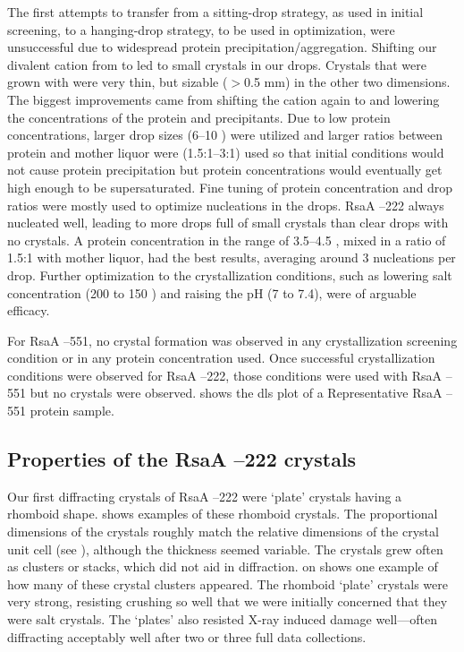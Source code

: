 The first attempts to transfer from a sitting-drop strategy, as used in initial screening, to a hanging-drop strategy, to be used in optimization, were unsuccessful due to widespread protein precipitation/aggregation. Shifting our divalent cation from  to  led to small crystals in our drops. Crystals that were grown with  were very thin, but sizable ($>$0.5 \si{\milli\meter}) in the other two dimensions. The biggest improvements came from shifting the cation again to  and lowering the concentrations of the protein and precipitants. Due to low protein concentrations, larger drop sizes (6--10 \microlitre) were utilized and larger ratios between protein and mother liquor were (1.5:1--3:1) used so that initial conditions would not cause protein precipitation but protein concentrations would eventually get high enough to be supersaturated. Fine tuning of protein concentration and drop ratios were mostly used to optimize nucleations in the drops. RsaA --222 always nucleated well, leading to more drops full of small crystals than clear drops with no crystals. A protein concentration in the range of 3.5--4.5 \mgperml, mixed in a ratio of 1.5:1 with mother liquor, had the best results, averaging around 3 nucleations per drop. Further optimization to the crystallization conditions, such as lowering salt concentration (200 \millimolar to 150 \millimolar) and raising the pH (7 to 7.4), were of arguable efficacy. 

For RsaA --551, no crystal formation was observed in any crystallization screening condition or in any protein concentration used. Once successful crystallization conditions were observed for RsaA --222, those conditions were used with RsaA --551 but no crystals were observed.  shows the \ac{dls} plot of a Representative RsaA --551 protein sample.

\subsection{Properties of the RsaA --222 crystals}\label{sec:properties-crystals}
Our first diffracting crystals of RsaA --222 were `plate' crystals having a rhomboid shape.   shows examples of these rhomboid crystals. The proportional dimensions of the crystals roughly match the relative dimensions of the crystal unit cell (see ), although the thickness seemed variable. The crystals grew often as clusters or stacks, which did not aid in diffraction.  on  shows one example of how many of these crystal clusters appeared. The rhomboid `plate' crystals were very strong, resisting crushing so well that we were initially concerned that they were salt crystals. The `plates' also resisted X-ray induced damage well---often diffracting acceptably well after two or three full data collections. 

